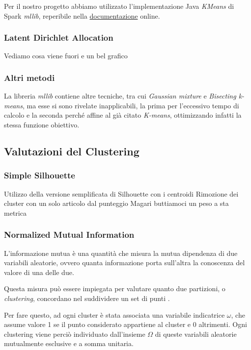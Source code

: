 \documentclass[
	12pt, %
	a4paper, %
	oneside, %
	headinclude,footinclude, %
	BCOR5mm, %
]{scrartcl}
\begin{document}
			Per il nostro progetto abbiamo utilizzato l'implementazione Java \emph{KMeans} di Spark \emph{mllib}, reperibile nella \href{https://spark.apache.org/docs/2.1.0/mllib-clustering.html#k-means}{documentazione} online.

		\subsubsection{Latent Dirichlet Allocation}

			Vediamo cosa viene fuori e un bel grafico

		\subsubsection{Altri metodi}
			La libreria \emph{mllib} contiene altre tecniche, tra cui \emph{Gaussian mixture} e \emph{Bisecting k-means}, ma esse si sono rivelate inapplicabili, la prima per l'eccessivo tempo di calcolo e la seconda perché affine al già citato \emph{K-means}, ottimizzando infatti la stessa funzione obiettivo.

	\subsection{Valutazioni del Clustering}

		\subsubsection{Simple Silhouette}
			Utilizzo della versione semplificata di Silhouette con i centroidi
			Rimozione dei cluster con un solo articolo dal punteggio
			Magari buttiamoci un peso a sta metrica

		\subsubsection{Normalized Mutual Information}
			L'informazione mutua è una quantità che misura la mutua dipendenza di due variabili aleatorie, ovvero quanta informazione porta sull'altra la conoscenza del valore di una delle due.

			Questa misura può essere impiegata per valutare quanto due partizioni, o \emph{clustering}, concordano nel suddividere un set di punti \cite{Manning}.

			Per fare questo, ad ogni cluster è stata associata una variabile indicatrice $\omega$, che assume valore 1 se il punto considerato appartiene al cluster e 0 altrimenti.
			Ogni clustering viene perciò individuato dall'insieme $\Omega$ di queste variabili aleatorie mutualmente esclusive e a somma unitaria.
\end{document}
